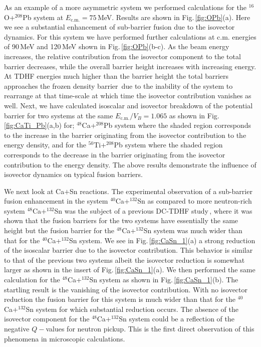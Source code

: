 As an example of a more asymmetric system we performed calculations for the $^{16}$O+$^{208}$Pb system
at $E_{\mathrm{c.m.}}=75$\,MeV. Results are shown in Fig.\,\ref{fig:OPb}(a). Here we see a
substantial enhancement of sub-barrier fusion due to the isovector dynamics.
For this system we have performed further
calculations at c.m. energies of 90\,MeV and 120\,MeV shown in Fig.\,\ref{fig:OPb}(b-c).
As the beam energy  increases, the
relative contribution from the isovector component to the total barrier decreases, while the overall barrier height increases with
increasing energy. At TDHF energies much higher than the barrier height the total barriers approaches the frozen density
barrier\,\citep{washiyama2008,umar2014a}
due to the inability of the system to rearrange at that time-scale at which time the isovector contribution vanishes as well.
Next, we have calculated isoscalar and isovector breakdown of the potential barrier for two
systems at the same $E_\mathrm{c.m.}/V_B=1.065$ as shown in Fig.\,\ref{fig:CaTi_Pb}(a,b) for;
$^{48}$Ca+$^{208}$Pb system where the shaded region corresponds to the increase in the barrier
originating
from the isovector contribution to the energy density, and for the
$^{50}$Ti+$^{208}$Pb system where
the shaded region corresponds to the decrease in the barrier originating from the isovector
contribution to
the energy density.
The above results demonstrate the influence of isovector dynamics on typical fusion barriers.

We next look at Ca$+$Sn reactions.
The experimental observation of a sub-barrier fusion enhancement in the system $^{40}$Ca+$^{132}$Sn
as compared to more neutron-rich system $^{48}$Ca+$^{132}$Sn was the subject of a previous DC-TDHF study\,\citep{oberacker2013},
where it was shown that the fusion barriers for the two systems have essentially the same height but the fusion barrier for
the $^{48}$Ca+$^{132}$Sn system was much wider than that for the $^{40}$Ca+$^{132}$Sn system.
We see in Fig.\,\ref{fig:CaSn_1}(a) a strong reduction of the isoscalar barrier due to the isovector contribution. This behavior is similar to that of the previous
two systems albeit the isovector reduction is somewhat larger as shown in the insert of
Fig.\,\ref{fig:CaSn_1}(a).
We then performed the same calculation for the $^{48}$Ca+$^{132}$Sn system as shown in Fig.\,\ref{fig:CaSn_1}(b).
The startling result is the vanishing of the isovector contribution. With no isovector reduction the fusion barrier for this
system is much wider than that for the $^{40}$Ca+$^{132}$Sn system for which substantial reduction occurs.
The absence of the isovector component for the $^{48}$Ca+$^{132}$Sn system could be a reflection of the negative $Q-$values
for neutron pickup. This is the first direct observation of this phenomena in microscopic calculations.

